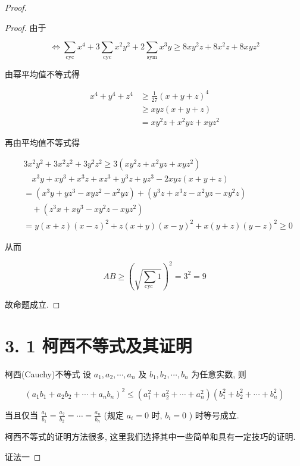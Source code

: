 \begin{proof}
\begin{proof}
	由于
	
	$$
	\Leftrightarrow \sum_{\mathrm{cyc}} x^{4}+3 \sum_{\mathrm{cyc}} x^{2} y^{2}+2 \sum_{\mathrm{sym}} x^{3} y \geqslant 8 x y^{2} z+8 x^{2} z+8 x y z^{2}
	$$
	
	由幂平均值不等式得
	
	$$
	\begin{aligned}
	x^{4}+y^{4}+z^{4} & \geqslant \frac{1}{27}(x+y+z)^{4} \\
	& \geqslant x y z(x+y+z) \\
	& =x y^{2} z+x^{2} y z+x y z^{2}
	\end{aligned}
	$$
	
	再由平均值不等式得
	
	$$
	\begin{aligned}
	& 3 x^{2} y^{2}+3 x^{2} z^{2}+3 y^{2} z^{2} \geqslant 3\left(x y^{2} z+x^{2} y z+x y z^{2}\right) \\
	& \quad x^{3} y+x y^{3}+x^{3} z+x z^{3}+y^{3} z+y z^{3}-2 x y z(x+y+z) \\
	& =\left(x^{3} y+y z^{3}-x y z^{2}-x^{2} y z\right)+\left(y^{3} z+x^{3} z-x^{2} y z-x y^{2} z\right) \\
	& \quad+\left(z^{3} x+x y^{3}-x y^{2} z-x y z^{2}\right) \\
	& =y(x+z)(x-z)^{2}+z(x+y)(x-y)^{2}+x(y+z)(y-z)^{2} \geqslant 0
	\end{aligned}
	$$
	
	从而
	
	$$
	A B \geqslant\left(\sqrt{\sum_{\text {cyc }} 1}\right)^{2}=3^{2}=9
	$$
	
	故命题成立.
\end{proof}	

	\section*{3. 1 柯西不等式及其证明}
	柯西(Cauchy)不等式 设 $a_{1}, a_{2}, \cdots, a_{n}$ 及 $b_{1}, b_{2}, \cdots, b_{n}$ 为任意实数, 则
	
	$$
	\left(a_{1} b_{1}+a_{2} b_{2}+\cdots+a_{n} b_{n}\right)^{2} \leqslant\left(a_{1}^{2}+a_{2}^{2}+\cdots+a_{n}^{2}\right)\left(b_{1}^{2}+b_{2}^{2}+\cdots+b_{n}^{2}\right)
	$$
	
	当且仅当 $\frac{a_{1}}{b_{1}}=\frac{a_{2}}{b_{2}}=\cdots=\frac{a_{n}}{b_{n}}$ (规定 $a_{i}=0$ 时, $b_{i}=0$ ) 时等号成立.
	
	柯西不等式的证明方法很多, 这里我们选择其中一些简单和具有一定技巧的证明.
	
	证法一
	

\end{proof}

